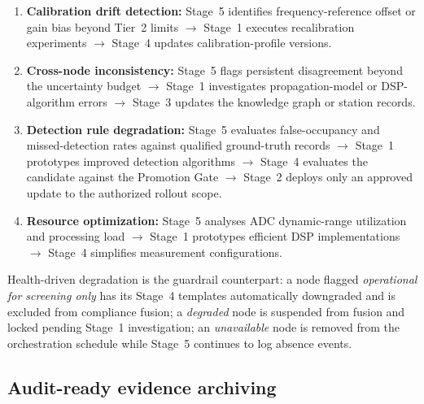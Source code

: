 \documentclass[11pt,a4paper]{article}
\begin{document}
\begin{enumerate}
  \item \textbf{Calibration drift detection:} Stage~5 identifies frequency-reference offset or
    gain bias beyond Tier~2 limits $\rightarrow$ Stage~1 executes recalibration experiments
    $\rightarrow$ Stage~4 updates calibration-profile versions.
  \item \textbf{Cross-node inconsistency:} Stage~5 flags persistent disagreement beyond the
    uncertainty budget $\rightarrow$ Stage~1 investigates propagation-model or DSP-algorithm
    errors $\rightarrow$ Stage~3 updates the knowledge graph or station records.
  \item \textbf{Detection rule degradation:} Stage~5 evaluates false-occupancy and
    missed-detection rates against qualified ground-truth records $\rightarrow$ Stage~1 prototypes
    improved detection algorithms $\rightarrow$ Stage~4 evaluates the candidate against the
    Promotion Gate $\rightarrow$ Stage~2 deploys only an approved update to the authorized
    rollout scope.
  \item \textbf{Resource optimization:} Stage~5 analyses ADC dynamic-range utilization and
    processing load $\rightarrow$ Stage~1 prototypes efficient DSP implementations
    $\rightarrow$ Stage~4 simplifies measurement configurations.
\end{enumerate}

Health-driven degradation is the guardrail counterpart: a node flagged \emph{operational for
screening only} has its Stage~4 templates automatically downgraded and is excluded from compliance
fusion; a \emph{degraded} node is suspended from fusion and locked pending Stage~1 investigation;
an \emph{unavailable} node is removed from the orchestration schedule while Stage~5 continues to
log absence events.

\subsection{Audit-ready evidence archiving}
\label{sec:archiving}
\end{document}
